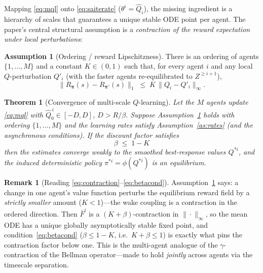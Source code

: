 \documentclass[11pt]{article}
\theoremstyle{plain}
\newtheorem{theorem}{Theorem}
\theoremstyle{definition}
\newtheorem{assumption}{Assumption}
\newtheorem{remark}{Remark}
\newcommand{\bpi}{\bm{\pi}}
\newcommand{\Qhat}{\hat{Q}}
\begin{document}
Mapping \eqref{eq:mql} onto \eqref{eq:saiterate} ($\theta^i=\Qhat_i$), the
missing ingredient is a hierarchy of scales that guarantees a unique stable ODE
point per agent. The paper's central structural assumption is a
\emph{contraction of the reward expectation under local perturbations}:

\begin{assumption}[Ordering / reward Lipschitzness]
\label{as:order}
There is an ordering of agents $\{1,\dots,M\}$ and a constant $K\in(0,1)$ such
that, for every agent $i$ and any local $Q$-perturbation $Q'_i$ (with the
faster agents re-equilibrated to $Z^{\ge i+1}$),
\begin{equation}
  \big\|R_{\bpi}(s) - R_{\bpi'}(s)\big\|_1
  \;\le\; K\,\big\|Q_i - Q'_i\big\|_{\infty}.
  \label{eq:contraction}
\end{equation}
\end{assumption}

\begin{theorem}[Convergence of multi-scale $Q$-learning]
\label{thm:mql}
Let the $M$ agents update \eqref{eq:mql} with $\Qhat^{\,i}_0\in[-D,D]$,
$D>R/\beta$. Suppose Assumption~\ref{as:order} holds with ordering
$\{1,\dots,M\}$ and the learning rates satisfy Assumption~\ref{as:rates}
(and the asynchronous conditions). If the discount factor satisfies
\begin{equation}
  \boxed{\;\beta \;\le\; 1 - K\;}
  \label{eq:betacond}
\end{equation}
then the estimates converge weakly to the smoothed best-response values
$Q^{*i}$, and the induced deterministic policy $\pi^{*i}=\phi(Q^{*i})$ is an
equilibrium.
\end{theorem}

\begin{remark}[Reading \eqref{eq:contraction}--\eqref{eq:betacond}]
Assumption~\ref{as:order} says: a change in one agent's value function
perturbs the equilibrium reward field by a \emph{strictly smaller} amount
($K<1$)---the wake coupling is a contraction in the ordered direction. Then
$\bar F^i$ is a $(K+\beta)$-contraction in $\|\cdot\|_\infty$, so the mean ODE
has a unique globally asymptotically stable fixed point, and
condition~\eqref{eq:betacond} ($\beta\le 1-K$, i.e.\ $K+\beta\le1$) is exactly
what pins the contraction factor below one. This is the multi-agent analogue
of the $\gamma$-contraction of the Bellman operator---made to hold
\emph{jointly} across agents via the timescale separation.
\end{remark}
\end{document}

